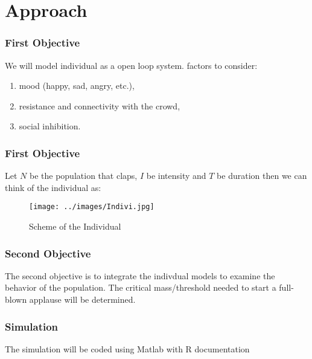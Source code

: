 \documentclass[compress,handout,10pt]{beamer}
\let\olditem\item
\renewcommand{\item}{\setlength{\itemsep}{0.5\baselineskip}\olditem}
\begin{document}
\section{Approach}
\begin{frame}
\frametitle{First Objective}
We will model individual as a open loop system.\newline{} factors to consider: \newline
	\begin{enumerate}
		\item mood (happy, sad, angry, etc.),\newline \newline
		\item resistance and connectivity with the crowd,\newline\newline
		\item social inhibition.		
	\end{enumerate}
\end{frame}

\begin{frame}
\frametitle{First Objective}
Let $N$ be the population that claps, $I$ be intensity and $T$ be duration then we can think of the individual as:\newline\newline\newline

\begin{figure}[h]
    \begin{center}
        \texttt{[image: ../images/Indivi.jpg]}
    \end{center}
    \caption{Scheme of the Individual}
    \label{fig:individual}
\end{figure}

\end{frame}

\begin{frame}
\frametitle{Second Objective}
The second objective is to integrate the indivdual models to examine the behavior of the population.\newline \newline
The critical mass/threshold needed to start a full-blown applause will be determined.
\end{frame}

\begin{frame}
\frametitle{Simulation}
The simulation will be coded using Matlab with R documentation 
\end{frame}
\end{document}
